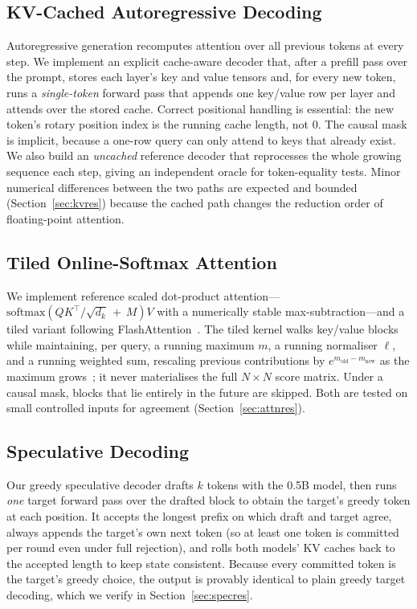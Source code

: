 \documentclass[conference]{IEEEtran}
\begin{document}
\subsection{KV-Cached Autoregressive Decoding}
\label{sec:kv}
Autoregressive generation recomputes attention over all previous tokens at every
step. We implement an explicit cache-aware decoder that, after a prefill pass
over the prompt, stores each layer's key and value tensors and, for every new
token, runs a \emph{single-token} forward pass that appends one key/value row per
layer and attends over the stored cache. Correct positional handling is
essential: the new token's rotary position index is the running cache length, not
0. The causal mask is implicit, because a one-row query can only attend to keys
that already exist. We also build an \emph{uncached} reference decoder that
reprocesses the whole growing sequence each step, giving an independent oracle
for token-equality tests. Minor numerical differences between the two paths are
expected and bounded (Section~\ref{sec:kvres}) because the cached path changes
the reduction order of floating-point attention.

\subsection{Tiled Online-Softmax Attention}
\label{sec:attn}
We implement reference scaled dot-product attention---$\mathrm{softmax}(QK^\top/
\sqrt{d_k}\,{+}\,M)V$ with a numerically stable max-subtraction---and a tiled
variant following FlashAttention~\cite{dao2022flashattention}. The tiled kernel
walks key/value blocks while maintaining, per query, a running maximum $m$, a
running normaliser $\ell$, and a running weighted sum, rescaling previous
contributions by $e^{m_{\text{old}}-m_{\text{new}}}$ as the maximum
grows~\cite{milakov2018online}; it never materialises the full $N{\times}N$ score
matrix. Under a causal mask, blocks that lie entirely in the future are skipped.
Both are tested on small controlled inputs for agreement
(Section~\ref{sec:attnres}).

\subsection{Speculative Decoding}
\label{sec:spec}
Our greedy speculative decoder drafts $k$ tokens with the 0.5B model, then runs
\emph{one} target forward pass over the drafted block to obtain the target's
greedy token at each position. It accepts the longest prefix on which draft and
target agree, always appends the target's own next token (so at least one token
is committed per round even under full rejection), and rolls both models' KV
caches back to the accepted length to keep state consistent. Because every
committed token is the target's greedy choice, the output is provably identical
to plain greedy target decoding, which we verify in Section~\ref{sec:specres}.
\end{document}
